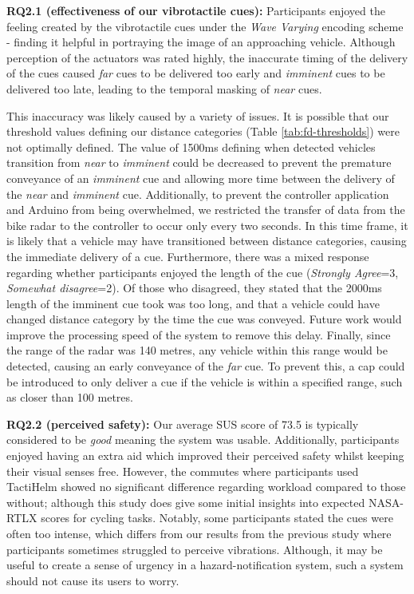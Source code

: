 \documentclass{mpaper}
\begin{document}
\textbf{RQ2.1 (effectiveness of our vibrotactile cues):} Participants enjoyed the feeling created by the vibrotactile cues under the \textit{Wave Varying} encoding scheme - finding it helpful in portraying the image of an approaching vehicle. Although perception of the actuators was rated highly, the inaccurate timing of the delivery of the cues caused \textit{far} cues to be delivered too early and \textit{imminent} cues to be delivered too late, leading to the temporal masking of \textit{near} cues. 

This inaccuracy was likely caused by a variety of issues. It is possible that our threshold values defining our distance categories (Table \ref{tab:fd-thresholds}) were not optimally defined. The value of 1500ms defining when detected vehicles transition from \textit{near} to \textit{imminent} could be decreased to prevent the premature conveyance of an \textit{imminent} cue and allowing more time between the delivery of the \textit{near} and \textit{imminent} cue. Additionally, to prevent the controller application and Arduino from being overwhelmed, we restricted the transfer of data from the bike radar to the controller to occur only every two seconds. In this time frame, it is likely that a vehicle may have transitioned between distance categories, causing the immediate delivery of a cue. Furthermore, there was a mixed response regarding whether participants enjoyed the length of the cue (\textit{Strongly Agree}=3, \textit{Somewhat disagree}=2). Of those who disagreed, they stated that the 2000ms length of the imminent cue took was too long, and that a vehicle could have changed distance category by the time the cue was conveyed. Future work would improve the processing speed of the system to remove this delay. Finally, since the range of the radar was 140 metres, any vehicle within this range would be detected, causing an early conveyance of the \textit{far} cue. To prevent this, a cap could be introduced to only deliver a cue if the vehicle is within a specified range, such as closer than 100 metres.

\textbf{RQ2.2 (perceived safety):} Our average SUS score of 73.5 is typically considered to be \textit{good} \cite{10.5555/2835587.2835589} meaning the system was usable. Additionally, participants enjoyed having an extra aid which improved their perceived safety whilst keeping their visual senses free. However, the commutes where participants used TactiHelm showed no significant difference regarding workload compared to those without; although this study does give some initial insights into expected NASA-RTLX scores for cycling tasks. Notably, some participants stated the cues were often too intense, which differs from our results from the previous study where participants sometimes struggled to perceive vibrations. Although, it may be useful to create a sense of urgency in a hazard-notification system, such a system should not cause its users to worry.
\end{document}
